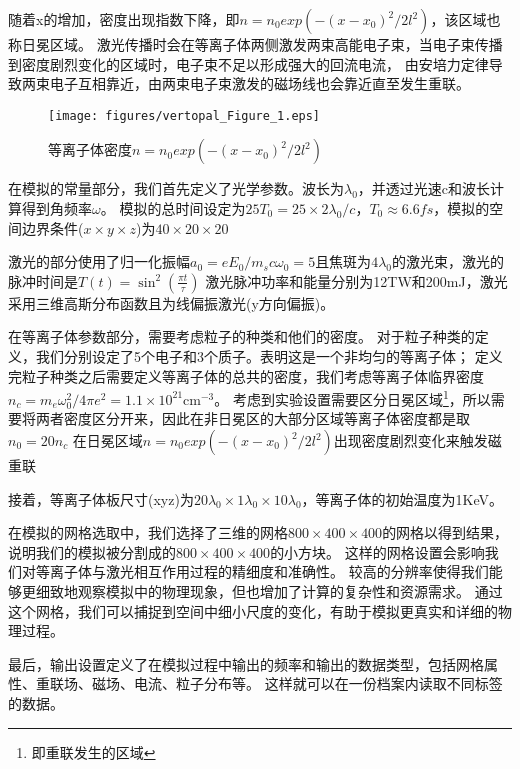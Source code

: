 随着x的增加，密度出现指数下降，即$\displaystyle n=n_0exp\left(-\left(x-x_0\right)^2/2l^2\right)$，该区域也称日冕区域。
激光传播时会在等离子体两侧激发两束高能电子束，当电子束传播到密度剧烈变化的区域时，电子束不足以形成强大的回流电流，
由安培力定律导致两束电子互相靠近，由两束电子束激发的磁场线也会靠近直至发生重联。\\
\begin{figure}[H]
    \centering
    \texttt{[image: figures/vertopal\_Figure\_1.eps]}
    \caption{等离子体密度$\displaystyle n=n_0exp\left(-\left(x-x_0\right)^2/2l^2\right)$}
    \label{density_plasma}
\end{figure}


在模拟的常量部分，我们首先定义了光学参数。波长为$\lambda_0$，并透过光速c和波长计算得到角频率$\omega$。
模拟的总时间设定为$\displaystyle 25T_0 = 25\times 2\lambda_0/c$，$T_0\approx 6.6fs$，模拟的空间边界条件($x\times y\times z$)为$40\times 20\times 20$

激光的部分使用了归一化振幅$a_0 = eE_0/m_sc\omega_0 = 5$且焦斑为$4\lambda_0$的激光束，激光的脉冲时间是$\displaystyle T(t) = \sin^2(\frac{\pi t}{\tau})$
激光脉冲功率和能量分别为12TW和200mJ，激光采用三维高斯分布函数且为线偏振激光(y方向偏振)。

在等离子体参数部分，需要考虑粒子的种类和他们的密度。
对于粒子种类的定义，我们分别设定了5个电子和3个质子。表明这是一个非均匀的等离子体；
定义完粒子种类之后需要定义等离子体的总共的密度，我们考虑等离子体临界密度$n_c=m_e\omega_0^2/4\pi e^2=1.1\times10^{21}\mathrm{cm}^{-3}$。
考虑到实验设置需要区分日冕区域\footnote{即重联发生的区域}，所以需要将两者密度区分开来，因此在非日冕区的大部分区域等离子体密度都是取$n_0 = 20n_c$
在日冕区域$\displaystyle n=n_0exp\left(-\left(x-x_0\right)^2/2l^2\right)$出现密度剧烈变化来触发磁重联

接着，等离子体板尺寸(xyz)为$20\lambda_0\times 1\lambda_0 \times 10\lambda_0$，等离子体的初始温度为1KeV。

在模拟的网格选取中，我们选择了三维的网格$800\times 400\times 400$的网格以得到结果，
说明我们的模拟被分割成的$800\times 400\times 400$的小方块。
这样的网格设置会影响我们对等离子体与激光相互作用过程的精细度和准确性。
较高的分辨率使得我们能够更细致地观察模拟中的物理现象，但也增加了计算的复杂性和资源需求。
通过这个网格，我们可以捕捉到空间中细小尺度的变化，有助于模拟更真实和详细的物理过程。

最后，输出设置定义了在模拟过程中输出的频率和输出的数据类型，包括网格属性、重联场、磁场、电流、粒子分布等。
这样就可以在一份档案内读取不同标签的数据。

